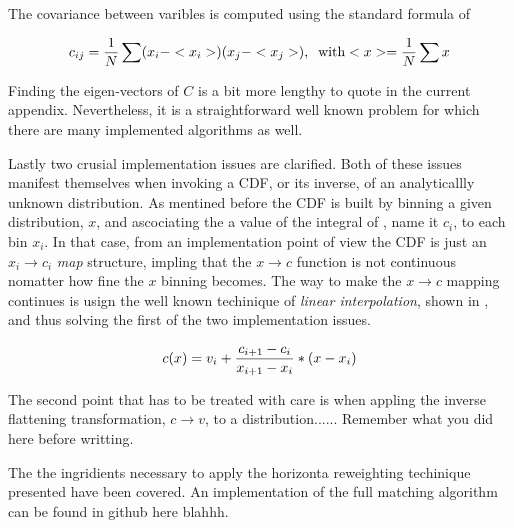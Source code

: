 \noindent The covariance between varibles is computed using the standard formula of 

\begin{equation}
\centering
c_{ij} = \frac{1}{N} \sum (x_i-<x_i>)(x_j-<x_j>), \;\; \text {with} <x> = \frac{1}{N} \sum x \nonumber
\label{hor_reww_correlation_formula}
\end{equation}

\noindent Finding the eigen-vectors of $C$ is a bit more lengthy to quote in the current appendix.
Nevertheless, it is a straightforward well known problem for which there are many implemented
algorithms as well.

Lastly two crusial implementation issues are clarified. Both of these issues manifest themselves
when invoking a CDF, or its inverse, of an analyticallly unknown distribution. As mentined before
the CDF is built by binning a given distribution, $x$, and ascociating the a value of the integral
of , name it $c_i$, to each bin $x_i$. In that case, from an implementation point
of view the CDF is just an $x_i \to c_i$ {\it map} structure, impling that the $x \to c$ function is
not continuous nomatter how fine the $x$ binning becomes. The way to make the $x \to c$ mapping
continues is usign the well known techinique of {\it linear interpolation}, shown in ,
and thus solving the first of the two implementation issues.

\begin{equation}
  c(x) = v_i + \frac{c_{i+1}-c_i}{x_{i+1}-x_i} *  \left( x - x_i \right)
  \label{linear_interpolation}
\end{equation}

\noindent The second point that has to be treated with care is when appling the inverse flattening
transformation, $c \to v$, to a distribution...... {\color{red} Remember what you did here before writting.}

The the ingridients necessary to apply the horizonta reweighting techinique presented have been covered.
An implementation of the full matching algorithm can be found in github here blahhh.

